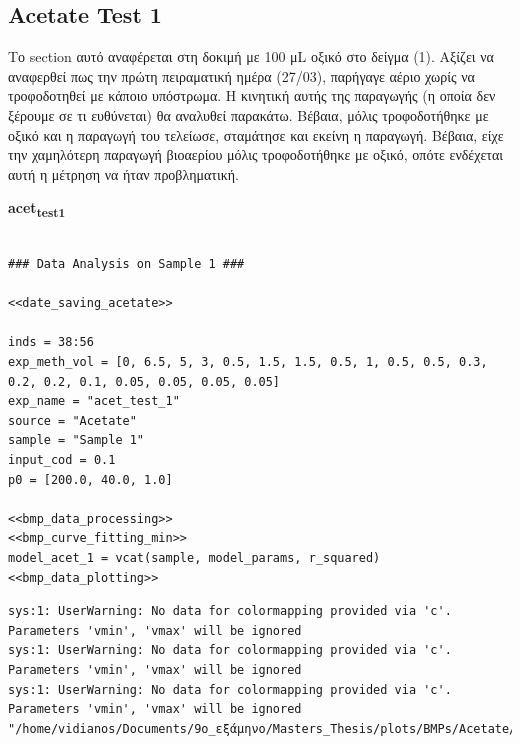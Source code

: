 \documentclass[11pt]{article}
\begin{document}
\subsection{Acetate Test 1}
\label{sec:orgcb55445}
Το section αυτό αναφέρεται στη δοκιμή με 100 μL οξικό στο δείγμα (1). Aξίζει να αναφερθεί πως την πρώτη πειραματική ημέρα (27/03), παρήγαγε αέριο χωρίς να τροφοδοτηθεί με κάποιο υπόστρωμα. Η κινητική αυτής της παραγωγής (η οποία δεν ξέρουμε σε τι ευθύνεται) θα αναλυθεί παρακάτω. Βέβαια, μόλις τροφοδοτήθηκε με οξικό και η παραγωγή του τελείωσε, σταμάτησε και εκείνη η παραγωγή. Βέβαια, είχε την χαμηλότερη παραγωγή βιοαερίου μόλις τροφοδοτήθηκε με οξικό, οπότε ενδέχεται αυτή η μέτρηση να ήταν προβληματική.

\textbf{acet\textsubscript{test}\textsubscript{1}}
\begin{verbatim}

### Data Analysis on Sample 1 ###

<<date_saving_acetate>>

inds = 38:56
exp_meth_vol = [0, 6.5, 5, 3, 0.5, 1.5, 1.5, 0.5, 1, 0.5, 0.5, 0.3, 0.2, 0.2, 0.1, 0.05, 0.05, 0.05, 0.05]
exp_name = "acet_test_1"
source = "Acetate"
sample = "Sample 1"
input_cod = 0.1
p0 = [200.0, 40.0, 1.0]

<<bmp_data_processing>>
<<bmp_curve_fitting_min>>
model_acet_1 = vcat(sample, model_params, r_squared)
<<bmp_data_plotting>>
\end{verbatim}

\begin{verbatim}
sys:1: UserWarning: No data for colormapping provided via 'c'. Parameters 'vmin', 'vmax' will be ignored
sys:1: UserWarning: No data for colormapping provided via 'c'. Parameters 'vmin', 'vmax' will be ignored
sys:1: UserWarning: No data for colormapping provided via 'c'. Parameters 'vmin', 'vmax' will be ignored
"/home/vidianos/Documents/9o_εξάμηνο/Masters_Thesis/plots/BMPs/Acetate/methane_kinetics_acet_test_1.png"
\end{verbatim}
\end{document}
